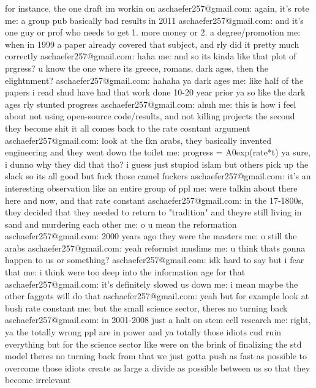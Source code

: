for instance, the one draft im workin on
 aschaefer257@gmail.com:  again, it's rote
 me:  a group pub basically bad results in 2011
 aschaefer257@gmail.com:  and it's one guy or prof who needs to get 1. more money or 2. a degree/promotion
 me:  when in 1999 a paper already covered that subject, and rly did it pretty much correctly
 aschaefer257@gmail.com:  haha
 me:  and so its kinda like that plot of prgress?
u know the one where its greece, romans, dark ages, then the elightnment?
 aschaefer257@gmail.com:  hahaha ya
dark ages
 me:  like half of the papers i read shud have had that work done 10-20 year prior
ya so like the dark ages rly stunted progress
 aschaefer257@gmail.com:  ahuh
 me:  this is how i feel about not using open-source code/results, and not killing projects the second they become shit
it all comes back to the rate cosntant argument
 aschaefer257@gmail.com:  look at the fkn arabs, they basically invented engineering and they went down the toilet
 me:  progress  = A0exp(rate*t)
ya sure, i dunno why they did that tho?
i guess just stupiod islam
but others pick up the slack so its all good
but fuck those camel fuckers
 aschaefer257@gmail.com:  it's an interesting observation
like an entire group of ppl
 me:  were talkin about there here and now, and that rate constant
 aschaefer257@gmail.com:  in the 17-1800s, they decided that they needed to return to "tradition"
and theyre still living in sand and murdering each other
 me:  o u mean the reformation
 aschaefer257@gmail.com:  2000 years ago they were the masters
 me:  o still the arabs
 aschaefer257@gmail.com:  yeah reformist muslims
 me:  u think thats gonna happen to us or something?
 aschaefer257@gmail.com:  idk hard to say
but i fear that
 me:  i think were too deep into the information age for that
 aschaefer257@gmail.com:  it's definitely slowed us down
 me:  i mean maybe the other faggots will do that
 aschaefer257@gmail.com:  yeah but for example look at bush
rate constant
 me:  but the small science sector, theres no turning back
 aschaefer257@gmail.com:  in 2001-2008
just a halt on stem cell research
 me:  right, ya the totally wrong ppl are in power
and ya totally those idiots cud ruin everything
but for the science sector
like were on the brink of finalizing the std model
theres no turning back from that
we just gotta push as fast as possible to overcome those idiots
create as large a divide as possible between us
so that they become irrelevant

